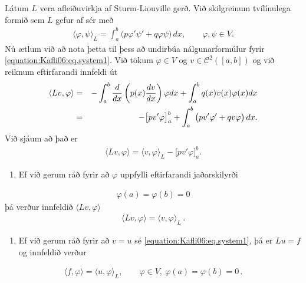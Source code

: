 \documentclass[a4paper,10pt,icelandic]{sphinxmanual}
\begin{document}
Látum \(L\) vera afleiðuvirkja af Sturm-Liouville gerð. Við skilgreinum tvílínulega formið sem \(L\) gefur af sér með
\begin{equation*}
\begin{split}{{\langle \varphi,\psi\rangle}}_L=\int_a^b\big(p\varphi' \psi'
+q\varphi \psi\big)\, dx,
\qquad \varphi, \psi \in V.\end{split}
\end{equation*}
Nú ætlum við að nota þetta til þess að undirbúa nálgunarformúlur fyrir \eqref{equation:Kafli06:eq.system1}.
Við tökum \(\varphi\in V\) og \(v\in \mathcal C^2([a,b])\) og við reiknum eftirfarandi innfeldi út
\begin{equation*}
\begin{split}{{\langle Lv,\varphi\rangle}} &=& -\int_a^b {d\over dx}\left(p(x){dv\over dx} \right)\varphi dx+ \int_a^b q(x) v(x) \varphi(x) dx
\\
    &=&
-\big[pv'\varphi\big]_a^b+ \int_a^b\big(pv'\varphi'+qv\varphi \big) \, dx.\end{split}
\end{equation*}
Við sjáum að það er
\begin{equation*}
\begin{split}{{\langle Lv,\varphi\rangle}}={{\langle v,\varphi\rangle}}_L-\big[pv'\varphi\big]_a^b.\end{split}
\end{equation*}\begin{enumerate}
\def\theenumi{\arabic{enumi}}
\def\labelenumi{\theenumi .}
\makeatletter\def\p@enumii{\p@enumi \theenumi .}\makeatother
\item {} 
Ef við gerum ráð fyrir að \(\varphi\) uppfylli eftirfarandi jaðarskilyrði

\end{enumerate}
\begin{equation*}
\begin{split}\varphi(a)=\varphi(b)=0\end{split}
\end{equation*}
þá verður innfeldið \(\langle Lv,\varphi\rangle\)
\begin{equation*}
\begin{split}{{\langle Lv,\varphi\rangle}}={{\langle v,\varphi\rangle}}_L\,.\end{split}
\end{equation*}\begin{enumerate}
\def\theenumi{\arabic{enumi}}
\def\labelenumi{\theenumi .}
\makeatletter\def\p@enumii{\p@enumi \theenumi .}\makeatother
\setcounter{enumi}{1}
\item {} 
Ef við gerum ráð fyrir að \(v=u\) sé  \eqref{equation:Kafli06:eq.system1}, þá er \(Lu=f\) og innfeldið verður

\end{enumerate}
\begin{equation}\label{equation:Kafli06:eq.cond1}
\begin{split}{{\langle f,\varphi\rangle}}={{\langle u,\varphi\rangle}}_L, \qquad \varphi\in V, ~ \varphi(a)=\varphi(b)=0\,.\end{split}
\end{equation}
\end{document}
